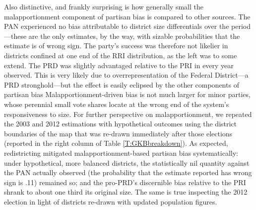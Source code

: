 \documentclass[letter,12pt]{article}
\begin{document}
Also distinctive, and frankly surprising is how generally small the malapportionment component of partisan bias is compared to other sources. The PAN experienced no bias attributable to district size differentials over the period---these are the only estimates, by the way, with sizable probabilities that the estimate is of wrong sign. The party's success was therefore not likelier in districts confined at one end of the RRI distribution, as the left was to some extend. The PRD was slightly advantaged relative to the PRI in every year observed. This is very likely due to overrepresentation of the Federal District---a PRD stronghold---but the effect is easily eclipsed by the other components of partisan bias \citep[The drop from +.14 to +.05 between 2003 and 2006 actually coincides with reapportionment and the accessory reduction---not removal---of the capital's overrepresentation in Congress, see][]{altman.magar.mcd.trelles2014apsa} Malapportionment-driven bias is not much larger for minor parties, whose perennial small vote shares locate at the wrong end of the system's responsiveness to size. For further perspective on malapportionment, we repeated the 2003 and 2012 estimations with hypothetical outcomes using the district boundaries of the map that was re-drawn immediately after those elections (reported in the right column of Table \ref{T:GKBbreakdown}). As expected, redistricting mitigated malapportionment-based partisan bias systematically: under hypothetical, more balanced districts, the statistically nil quantity against the PAN actually observed (the probability that the estimate reported has wrong sign is .11) remained so; and the pro-PRD's discernible bias relative to the PRI shrank to about one third its original size. The same is true inspecting the 2012 election in light of districts re-drawn with updated population figures. 

\end{document}
